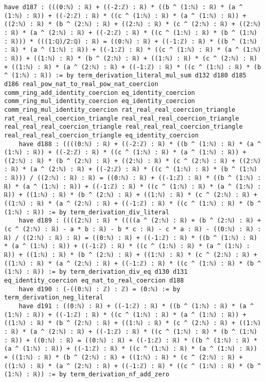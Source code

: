 \documentclass{article}
\begin{document}
\begin{tcolorbox}[colback=white!10, width=\linewidth]
\begin{lstlisting}[language=Lean4]
    have d187 : (((0:ℕ) : ℝ) + ((-2:ℤ) : ℝ) * ((b ^ (1:ℕ) : ℝ) * (a ^ (1:ℕ) : ℝ)) + ((-2:ℤ) : ℝ) * ((c ^ (1:ℕ) : ℝ) * (a ^ (1:ℕ) : ℝ)) + ((2:ℕ) : ℝ) * (b ^ (2:ℕ) : ℝ) + ((2:ℕ) : ℝ) * (c ^ (2:ℕ) : ℝ) + ((2:ℕ) : ℝ) * (a ^ (2:ℕ) : ℝ) + ((-2:ℤ) : ℝ) * ((c ^ (1:ℕ) : ℝ) * (b ^ (1:ℕ) : ℝ))) * (((1:ℚ)/2:ℚ) : ℝ) = ((0:ℕ) : ℝ) + ((-1:ℤ) : ℝ) * ((b ^ (1:ℕ) : ℝ) * (a ^ (1:ℕ) : ℝ)) + ((-1:ℤ) : ℝ) * ((c ^ (1:ℕ) : ℝ) * (a ^ (1:ℕ) : ℝ)) + ((1:ℕ) : ℝ) * (b ^ (2:ℕ) : ℝ) + ((1:ℕ) : ℝ) * (c ^ (2:ℕ) : ℝ) + ((1:ℕ) : ℝ) * (a ^ (2:ℕ) : ℝ) + ((-1:ℤ) : ℝ) * ((c ^ (1:ℕ) : ℝ) * (b ^ (1:ℕ) : ℝ)) := by term_derivation_literal_mul_sum d132 d180 d185 d186 real_pow_nat_to_real_pow_nat_coercion comm_ring_add_identity_coercion eq_identity_coercion comm_ring_mul_identity_coercion eq_identity_coercion comm_ring_mul_identity_coercion rat_real_real_coercion_triangle rat_real_real_coercion_triangle real_real_real_coercion_triangle real_real_real_coercion_triangle real_real_real_coercion_triangle real_real_real_coercion_triangle eq_identity_coercion
    have d188 : ((((0:ℕ) : ℝ) + ((-2:ℤ) : ℝ) * ((b ^ (1:ℕ) : ℝ) * (a ^ (1:ℕ) : ℝ)) + ((-2:ℤ) : ℝ) * ((c ^ (1:ℕ) : ℝ) * (a ^ (1:ℕ) : ℝ)) + ((2:ℕ) : ℝ) * (b ^ (2:ℕ) : ℝ) + ((2:ℕ) : ℝ) * (c ^ (2:ℕ) : ℝ) + ((2:ℕ) : ℝ) * (a ^ (2:ℕ) : ℝ) + ((-2:ℤ) : ℝ) * ((c ^ (1:ℕ) : ℝ) * (b ^ (1:ℕ) : ℝ))) / ((2:ℕ) : ℝ) : ℝ) = ((0:ℕ) : ℝ) + ((-1:ℤ) : ℝ) * ((b ^ (1:ℕ) : ℝ) * (a ^ (1:ℕ) : ℝ)) + ((-1:ℤ) : ℝ) * ((c ^ (1:ℕ) : ℝ) * (a ^ (1:ℕ) : ℝ)) + ((1:ℕ) : ℝ) * (b ^ (2:ℕ) : ℝ) + ((1:ℕ) : ℝ) * (c ^ (2:ℕ) : ℝ) + ((1:ℕ) : ℝ) * (a ^ (2:ℕ) : ℝ) + ((-1:ℤ) : ℝ) * ((c ^ (1:ℕ) : ℝ) * (b ^ (1:ℕ) : ℝ)) := by term_derivation_div_literal
    have d189 : ((((2:ℕ) : ℝ) * ((((a ^ (2:ℕ) : ℝ) + (b ^ (2:ℕ) : ℝ) + (c ^ (2:ℕ) : ℝ) - a * b : ℝ) - b * c : ℝ) - c * a : ℝ) - ((0:ℕ) : ℝ) : ℝ) / ((2:ℕ) : ℝ) : ℝ) = ((0:ℕ) : ℝ) + ((-1:ℤ) : ℝ) * ((b ^ (1:ℕ) : ℝ) * (a ^ (1:ℕ) : ℝ)) + ((-1:ℤ) : ℝ) * ((c ^ (1:ℕ) : ℝ) * (a ^ (1:ℕ) : ℝ)) + ((1:ℕ) : ℝ) * (b ^ (2:ℕ) : ℝ) + ((1:ℕ) : ℝ) * (c ^ (2:ℕ) : ℝ) + ((1:ℕ) : ℝ) * (a ^ (2:ℕ) : ℝ) + ((-1:ℤ) : ℝ) * ((c ^ (1:ℕ) : ℝ) * (b ^ (1:ℕ) : ℝ)) := by term_derivation_div_eq d130 d131 eq_identity_coercion eq_nat_to_real_coercion d188
    have d190 : (-((0:ℕ) : ℤ) : ℤ) = (0:ℕ) := by term_derivation_neg_literal
    have d191 : ((0:ℕ) : ℝ) + ((-1:ℤ) : ℝ) * ((b ^ (1:ℕ) : ℝ) * (a ^ (1:ℕ) : ℝ)) + ((-1:ℤ) : ℝ) * ((c ^ (1:ℕ) : ℝ) * (a ^ (1:ℕ) : ℝ)) + ((1:ℕ) : ℝ) * (b ^ (2:ℕ) : ℝ) + ((1:ℕ) : ℝ) * (c ^ (2:ℕ) : ℝ) + ((1:ℕ) : ℝ) * (a ^ (2:ℕ) : ℝ) + ((-1:ℤ) : ℝ) * ((c ^ (1:ℕ) : ℝ) * (b ^ (1:ℕ) : ℝ)) + ((0:ℕ) : ℝ) = ((0:ℕ) : ℝ) + ((-1:ℤ) : ℝ) * ((b ^ (1:ℕ) : ℝ) * (a ^ (1:ℕ) : ℝ)) + ((-1:ℤ) : ℝ) * ((c ^ (1:ℕ) : ℝ) * (a ^ (1:ℕ) : ℝ)) + ((1:ℕ) : ℝ) * (b ^ (2:ℕ) : ℝ) + ((1:ℕ) : ℝ) * (c ^ (2:ℕ) : ℝ) + ((1:ℕ) : ℝ) * (a ^ (2:ℕ) : ℝ) + ((-1:ℤ) : ℝ) * ((c ^ (1:ℕ) : ℝ) * (b ^ (1:ℕ) : ℝ)) := by term_derivation_nf_add_zero

\end{lstlisting}
\end{tcolorbox}
\end{document}
